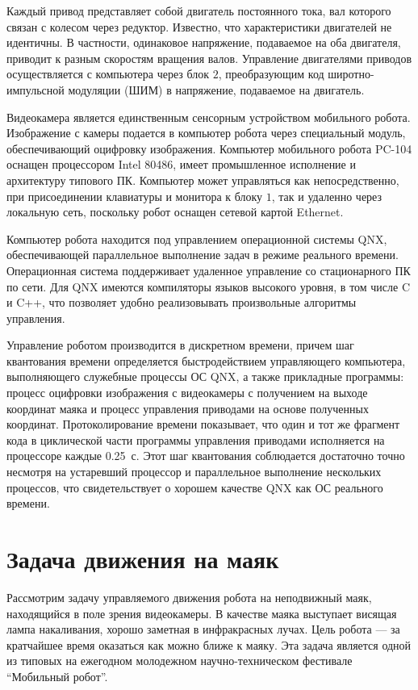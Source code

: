 Каждый привод представляет собой двигатель постоянного тока, вал
которого связан с колесом через редуктор.  Известно, что
характеристики двигателей не идентичны.  В частности, одинаковое
напряжение, подаваемое на оба двигателя, приводит к разным скоростям
вращения валов.  Управление двигателями приводов осуществляется с
компьютера через блок $2$, преобразующим код широтно-импульсной
модуляции (ШИМ) в напряжение, подаваемое на двигатель.

Видеокамера является единственным сенсорным устройством мобильного
робота.  Изображение с камеры подается в компьютер робота через
специальный модуль, обеспечивающий оцифровку изображения.  Компьютер
мобильного робота PC-104 оснащен процессором Intel 80486, имеет
промышленное исполнение и архитектуру типового ПК.  Компьютер может
управляться как непосредственно, при присоединении клавиатуры и
монитора к блоку $1$, так и удаленно через локальную сеть, поскольку
робот оснащен сетевой картой Ethernet.

Компьютер робота находится под управлением операционной системы QNX,
обеспечивающей параллельное выполнение задач в режиме реального
времени.  Операционная система поддерживает удаленное управление со
стационарного ПК по сети.  Для QNX имеются компиляторы языков высокого
уровня, в том числе {\sf C} и {\sf C++}, что позволяет удобно
реализовывать произвольные алгоритмы управления.

Управление роботом производится в дискретном времени, причем шаг
квантования времени определяется быстродействием управляющего
компьютера, выполняющего служебные процессы ОС QNX, а также прикладные
программы: процесс оцифровки изображения с видеокамеры с получением на
выходе координат маяка и процесс управления приводами на основе
полученных координат.  Протоколирование времени показывает, что один и
тот же фрагмент кода в циклической части программы управления
приводами исполняется на процессоре каждые 0.25~с.  Этот шаг
квантования соблюдается достаточно точно несмотря на устаревший
процессор и параллельное выполнение нескольких процессов, что
свидетельствует о хорошем качестве QNX как ОС реального времени.

\section{Задача движения на маяк}

Рассмотрим задачу управляемого движения робота на неподвижный маяк,
находящийся в поле зрения видеокамеры.  В качестве маяка выступает
висящая лампа накаливания, хорошо заметная в инфракрасных лучах.  Цель
робота --- за кратчайшее время оказаться как можно ближе к маяку.  Эта
задача является одной из типовых на ежегодном молодежном
научно-техническом фестивале ``Мобильный робот''.

